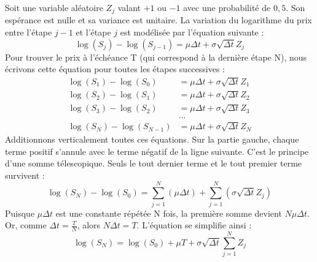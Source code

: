 \begin{examplebox}
Soit une variable aléatoire $Z_j$ valant $+1$ ou $-1$ avec une probabilité de $0,5$. Son espérance est nulle et sa variance est unitaire.
La variation du logarithme du prix entre l'étape $j-1$ et l'étape $j$ est modélisée par l'équation suivante :
\begin{equation*}
    \log(S_j) - \log(S_{j-1}) = \mu \Delta t + \sigma \sqrt{\Delta t} Z_j
\end{equation*}
Pour trouver le prix à l'échéance T (qui correspond à la dernière étape N), nous écrivons cette équation pour toutes les étapes successives :
\begin{align*}
    \log(S_1) - \log(S_0) &= \mu \Delta t + \sigma \sqrt{\Delta t} Z_1 \\
    \log(S_2) - \log(S_1) &= \mu \Delta t + \sigma \sqrt{\Delta t} Z_2 \\
    \log(S_3) - \log(S_2) &= \mu \Delta t + \sigma \sqrt{\Delta t} Z_3 \\
    &\dots \\
    \log(S_N) - \log(S_{N-1}) &= \mu \Delta t + \sigma \sqrt{\Delta t} Z_N
\end{align*}
Additionnons verticalement toutes ces équations. Sur la partie gauche, chaque terme positif s'annule avec le terme négatif de la ligne suivante. C'est le principe d'une somme télescopique. Seuls le tout dernier terme et le tout premier terme survivent :
\begin{equation*}
    \log(S_N) - \log(S_0) = \sum_{j=1}^{N} \left( \mu \Delta t \right) + \sum_{j=1}^{N} \left( \sigma \sqrt{\Delta t} Z_j \right)
\end{equation*}
Puisque $\mu \Delta t$ est une constante répétée N fois, la première somme devient $N \mu \Delta t$. Or, comme $\Delta t = \frac{T}{N}$, alors $N \Delta t = T$. L'équation se simplifie ainsi :
\begin{equation*}
    \log(S_N) = \log(S_0) + \mu T + \sigma \sqrt{\Delta t} \sum_{j=1}^{N} Z_j
\end{equation*}
\end{examplebox}

